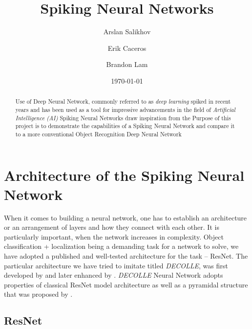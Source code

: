 \documentclass{article}
\title{Spiking Neural Networks}
\author{Arslan Salikhov \\
	\and 
	Erik Caceros \\
	\and
	Brandon Lam \\
	}
\date{\today}
\begin{document}
\begin{titlingpage}
\maketitle
\begin{abstract}
	Use of Deep Neural Network, commonly referred to as
	\emph{deep learning} spiked in recent years and has been used
	as a tool for impressive advancements in the field of 
	\emph{Artificial Intelligence (AI)}
	Spiking Neural Networks draw inspiration from the 
	Purpose of this project is to demonstrate the capabilities of a 
	Spiking Neural Network and compare it to a more conventional 
	Object Recognition Deep Neural Network
	\end{abstract}
\end{titlingpage}


\tableofcontents
\newpage




\section{Architecture of the Spiking Neural Network}

When it comes to building a neural network, one has to establish an
architecture or an arrangement of layers and how they connect with each other.
It is particularly important, when the network increases in complexity. Object
classification + localization being a demanding task for a network to solve,
we have adopted a published and well-tested architecture for the task --
ResNet. The particular architecture we have tried to imitate titled 
\textit{DECOLLE}, was first developed by  and later
enhanced by . \textit{DECOLLE} Neural Network adopts 
properties of classical ResNet model architecture as well as a pyramidal structure that
was proposed by . 

\subsection{ResNet}
\end{document}
